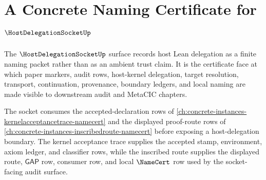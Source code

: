 \chapter{A Concrete Naming Certificate for $\HostDelegationSocketUp$}
\label{ch:concrete-instances-hostdelegationsocket-namecert}

The $\HostDelegationSocketUp$ surface records host Lean delegation as a finite naming packet rather than as an ambient trust claim. It is the certificate face at which paper markers, audit rows, host-kernel delegation, target resolution, transport, continuation, provenance, boundary ledgers, and local naming are made visible to downstream audit and MetaCIC chapters.

The socket consumes the accepted-declaration rows of \autoref{ch:concrete-instances-kernelacceptancetrace-namecert} and the displayed proof-route rows of \autoref{ch:concrete-instances-inscribedroute-namecert} before exposing a host-delegation boundary. The kernel acceptance trace supplies the accepted stamp, environment, axiom ledger, and classifier rows, while the inscribed route supplies the displayed route, $\mathsf{GAP}$ row, consumer row, and local $\NameCert$ row used by the socket-facing audit surface.

